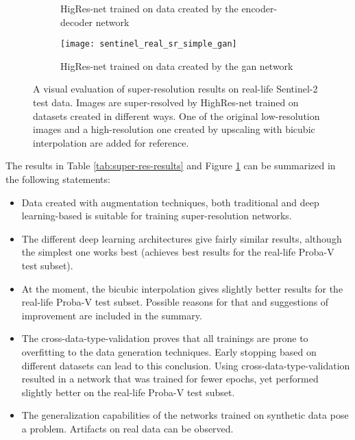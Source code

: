 \begin{figure}
\begin{subfigure}[t]{0.32\textwidth}
        \caption{HigRes-net trained on data created by the encoder-decoder network}
    \end{subfigure}
    \hfill
    \smallskip
    \centering
    \hfill
    \begin{subfigure}[t]{0.32\textwidth}
        \centering
        \texttt{[image: sentinel\_real\_sr\_simple\_gan]}
        \caption{HigRes-net trained on data created by the \gls{gan} network}
    \end{subfigure}
    \hfill
    \captionsetup{justification=justified}
    \caption{A visual evaluation of super-resolution results on real-life Sentinel-2 test data. Images are super-resolved by HighRes-net trained on datasets created in different ways. One of the original low-resolution images and a high-resolution one created by upscaling with bicubic interpolation are added for reference.}
    \label{fig:sentinel-real-artifacts}
\end{figure}

The results in Table \ref{tab:super-res-results} and Figure \ref{fig:sentinel-real-artifacts} can be summarized in the following statements:
\begin{itemize}
	\item Data created with augmentation techniques, both traditional and deep learning-based is suitable for training super-resolution networks.
	\item The different deep learning architectures give fairly similar results, although the simplest one works best (achieves best results for the real-life Proba-V test subset).
	\item At the moment, the bicubic interpolation gives slightly better results for the real-life Proba-V test subset. Possible reasons for that and suggestions of improvement are included in the summary.
	\item The cross-data-type-validation proves that all trainings are prone to overfitting to the data generation techniques. Early stopping based on different datasets can lead to this conclusion. Using cross-data-type-validation resulted in a network that was trained for fewer epochs, yet performed slightly better on the real-life Proba-V test subset.
	\item The generalization capabilities of the networks trained on synthetic data pose a problem. Artifacts on real data can be observed.
\end{itemize}